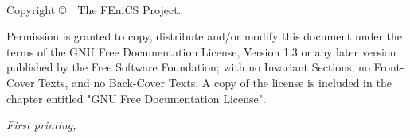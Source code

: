 ~\vfill
\thispagestyle{empty}


\noindent
Copyright \copyright\ \the\year\ The FEniCS Project.

\vspace{1ex}

\noindent
Permission is granted to copy, distribute and/or modify this document
under the terms of the GNU Free Documentation License, Version 1.3 or
any later version published by the Free Software Foundation; with no
Invariant Sections, no Front-Cover Texts, and no Back-Cover Texts.  A
copy of the license is included in the chapter entitled "GNU Free
Documentation License".

\vspace{1ex}

\noindent
\emph{First printing, \monthyear}
